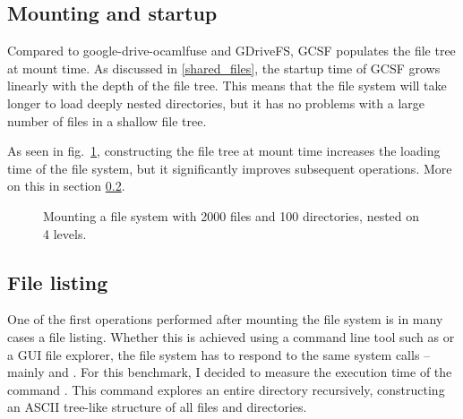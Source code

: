 \subsection{Mounting and startup}

Compared to google-drive-ocamlfuse and GDriveFS, GCSF populates the file tree at mount time. As discussed in \ref{shared_files}, the startup time of GCSF grows linearly with the depth of the file tree. This means that the file system will take longer to load deeply nested directories, but it has no problems with a large number of files in a shallow file tree.

As seen in fig.~\ref{fig:mount_benchmark}, constructing the file tree at mount time increases the loading time of the file system, but it significantly improves subsequent operations. More on this in section \ref{list_benchmark}.


\begin{figure}[bpt]
\centering
{}
\caption{Mounting a file system with 2000 files and 100 directories, nested on 4 levels.}
\label{fig:mount_benchmark}
\end{figure}


\subsection{File listing} \label{list_benchmark}

One of the first operations performed after mounting the file system is in many cases a file listing. Whether this is achieved using a command line tool such as  or a GUI file explorer, the file system has to respond to the same system calls -- mainly  and . For this benchmark, I decided to measure the execution time of the  command \cite{tree_man_page}. This  command explores an entire directory recursively, constructing an ASCII tree-like structure of all files and directories.

